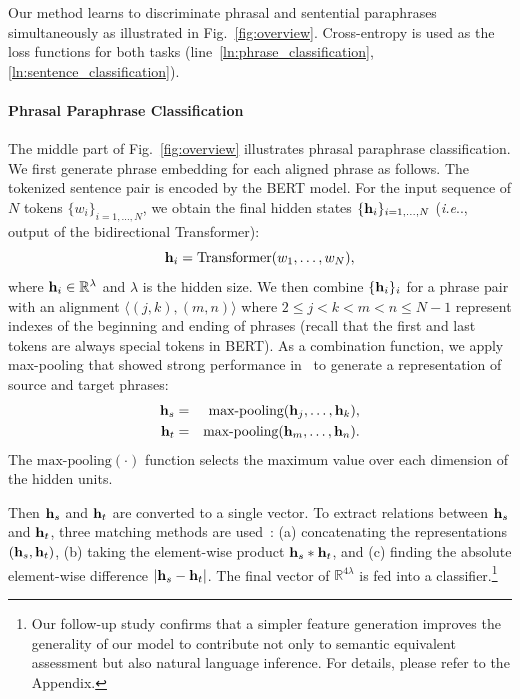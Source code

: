 \documentclass[11pt,a4paper]{article}
\makeatletter
\DeclareRobustCommand\onedot{\futurelet\@let@token\@onedot}
\def\@onedot{\ifx\@let@token.\else.\null\fi\xspace}
\def\ie{\emph{i.e}\onedot} \def\Ie{\emph{I.e}\onedot}
\newcommand{\Fref}[1]{Fig.~\ref{#1}}
\newcommand{\Lref}[1]{line~\ref{#1}}
\makeatother
\begin{document}
Our method learns to discriminate phrasal and sentential paraphrases simultaneously as illustrated in \Fref{fig:overview}. 
Cross-entropy is used as the loss functions for both tasks (\Lref{ln:phrase_classification}, \ref{ln:sentence_classification}).

\paragraph{Phrasal Paraphrase Classification}
The middle part of \Fref{fig:overview} illustrates phrasal paraphrase classification. 
We first generate phrase embedding for each aligned phrase as follows. 
The tokenized sentence pair is encoded by the BERT model. 
For the input sequence of $N$ tokens $\{w_i\}_{i=1,\ldots, N}$, we obtain the final hidden states $\{{\bf h}_i\}_{i=1,\ldots, N}$ (\ie, output of the bidirectional Transformer):
\[
{\bf h}_i=\text{Transformer}(w_1,\ldots,w_N),
\]
where ${\bf h}_i \in \mathbb{R}^\lambda$ and $\lambda$ is the hidden size. 
We then combine $\{{\bf h}_i\}_i$ for a phrase pair with an alignment $\langle (j, k),  (m, n) \rangle$ where $2\leq j < k< m < n \leq N-1$ represent indexes of the beginning and ending of phrases (recall that the first and last tokens are always special tokens in BERT). 
As a combination function, we apply max-pooling that showed strong performance in~\cite{D17-1070} to generate a representation of source and target phrases: 
\begin{eqnarray}
{\bf h}_s&=&\text{max-pooling}({\bf h}_j,\ldots, {\bf h}_k),\label{eq:max-pooling-s}\\
{\bf h}_t&=&\text{max-pooling}({\bf h}_m,\ldots,{\bf h}_n).	\label{eq:max-pooling-t}
\end{eqnarray}
The $\text{max-pooling}(\cdot)$ function selects the maximum value over each dimension of the hidden units. 


Then ${\bf h}_s$ and ${\bf h}_t$ are converted to a single vector. 
To extract relations between ${\bf h}_s$ and ${\bf h}_t$, three matching methods are used~\cite{D17-1070}: (a) concatenating the representations $({\bf h}_s, {\bf h}_t)$, (b) taking the element-wise product ${\bf h}_s * {\bf h}_t$, and (c) finding the absolute element-wise difference $|{\bf h}_s-{\bf h}_t|$. 
The final vector of $\mathbb{R}^{4\lambda}$ is fed into a classifier.\footnote{Our follow-up study confirms that a simpler feature generation improves the generality of our model to contribute not only to semantic equivalent assessment but also natural language inference. For details, please refer to the Appendix.} 
\end{document}
